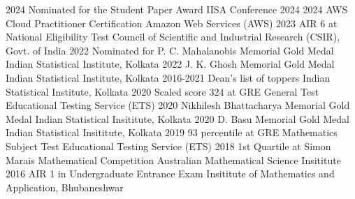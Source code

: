 \documentclass[10pt]{developercv} %
\begin{document}
\vspace{-0.2cm}
\begin{entrylist}
    \vspace*{-0.5cm}
    \entry
    {2024}
    {Nominated for the Student Paper Award}
    {IISA Conference 2024}
    {}
    \vspace*{-0.5cm}
    \entry
    {2024}
    {AWS Cloud Practitioner Certification}
    {Amazon Web Services (AWS)}
    {}
    \vspace*{-0.5cm}
    \entry
    {2023}
    {AIR 6 at National Eligibility Test}
    {Council of Scientific and Industrial Research (CSIR), Govt. of India}
    {}
    \vspace*{-0.5cm}
    \entry
    {2022}
    {Nominated for P. C. Mahalanobis Memorial Gold Medal}
    {Indian Statistical Institute, Kolkata}
    {}
    \vspace*{-0.5cm}
    \entry
    {2022}
    {J. K. Ghosh Memorial Gold Medal}
    {Indian Statistical Institute, Kolkata}
    {}
    \vspace*{-0.5cm}
    \entry
    {2016-2021}
    {Dean's list of toppers}
    {Indian Statistical Institute, Kolkata}
    {}
    \vspace*{-0.5cm}
    \entry
    {2020}
    {Scaled score 324 at GRE General Test}
    {Educational Testing Service (ETS)}
    {}
    \vspace*{-0.5cm}
    \entry
    {2020}
    {Nikhilesh Bhattacharya Memorial Gold Medal}
    {Indian Statistical Insititute, Kolkata}
    {}
    \vspace*{-0.5cm}
    \entry
    {2020}
    {D. Basu Memorial Gold Medal}
    {Indian Statistical Insititute, Kolkata}
    {}
    \vspace*{-0.5cm}
    \entry
    {2019}
    {93 percentile at GRE Mathematics Subject Test}
    {Educational Testing Service (ETS)}
    {}
    \vspace*{-0.5cm}
    \entry
    {2018}
    {1st Quartile at Simon Marais Mathematical Competition}
    {Australian Mathematical Science Insititute}
    {}
    \vspace*{-0.5cm}
    \entry
    {2016}
    {AIR 1 in Undergraduate Entrance Exam}
    {Insititute of Mathematics and Application, Bhubaneshwar}
    {}
\end{entrylist}

\end{document}
